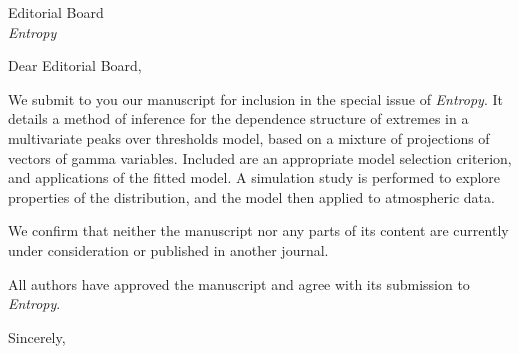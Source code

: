 \documentclass[letterpaper,11pt]{letter}
\begin{document}
%

\begin{letter}{Editorial Board \\ \emph{Entropy}}

\opening{Dear Editorial Board,}

We submit to you our manuscript for inclusion in the special issue of \emph{Entropy}.  It details a method of 
inference for the dependence structure of extremes in a multivariate peaks over thresholds model, based on a 
mixture of projections of vectors of gamma variables.  Included are an appropriate model selection 
criterion, and applications of the fitted model.  A simulation study is performed to explore properties of the 
distribution, and the model then applied to atmospheric data.

We confirm that neither the manuscript nor any parts of its content are currently under consideration or published in another journal.

All authors have approved the manuscript and agree with its submission to \emph{Entropy}.

Sincerely,

\closing{~}

\end{letter}
\end{document}
